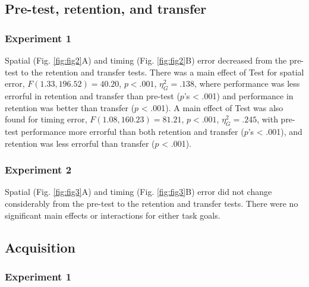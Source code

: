 \documentclass[
  man, donotrepeattitle,floatsintext]{apa7}
\begin{document}
\hypertarget{pre-test-retention-and-transfer}{%
\subsection{Pre-test, retention, and transfer}\label{pre-test-retention-and-transfer}}

\hypertarget{experiment-1-2}{%
\subsubsection{Experiment 1}\label{experiment-1-2}}

Spatial (Fig. \ref{fig:fig2}A) and timing (Fig. \ref{fig:fig2}B) error decreased from the pre-test to the retention and transfer tests. There was a main effect of Test for spatial error, \(F(1.33,196.52) = 40.20\), \(p < .001\), \(\eta_{G}^2 = .138\), where performance was less errorful in retention and transfer than pre-test (\(p\)'s \textless{} .001) and performance in retention was better than transfer (\(p\) \textless{} .001). A main effect of Test was also found for timing error, \(F(1.08,160.23) = 81.21\), \(p < .001\), \(\eta_{G}^2 = .245\), with pre-test performance more errorful than both retention and transfer (\(p\)'s \textless{} .001), and retention was less errorful than transfer (\(p\) \textless{} .001).

\hypertarget{experiment-2-2}{%
\subsubsection{Experiment 2}\label{experiment-2-2}}

Spatial (Fig. \ref{fig:fig3}A) and timing (Fig. \ref{fig:fig3}B) error did not change considerably from the pre-test to the retention and transfer tests. There were no significant main effects or interactions for either task goals.

\hypertarget{acquisition}{%
\subsection{Acquisition}\label{acquisition}}

\hypertarget{experiment-1-3}{%
\subsubsection{Experiment 1}\label{experiment-1-3}}
\end{document}
